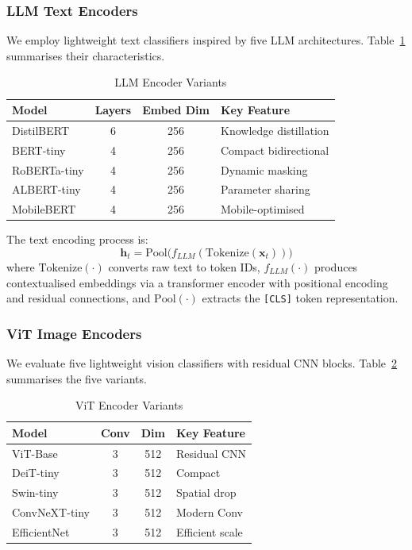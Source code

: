 \documentclass[conference]{IEEEtran}
\begin{document}
\subsubsection{LLM Text Encoders}

We employ lightweight text classifiers inspired by five LLM architectures.
Table~\ref{tab:llmenc} summarises their characteristics.

\begin{table}[t]
\caption{LLM Encoder Variants}
\label{tab:llmenc}
\centering\footnotesize
\begin{tabular}{lccl}
\toprule
\textbf{Model} & \textbf{Layers} & \textbf{Embed Dim} & \textbf{Key Feature}\\
\midrule
DistilBERT    & 6 & 256 & Knowledge distillation \\
BERT-tiny     & 4 & 256 & Compact bidirectional \\
RoBERTa-tiny  & 4 & 256 & Dynamic masking \\
ALBERT-tiny   & 4 & 256 & Parameter sharing \\
MobileBERT    & 4 & 256 & Mobile-optimised \\
\bottomrule
\end{tabular}
\end{table}

The text encoding process is:
\begin{equation}
  \mathbf{h}_t = \mathrm{Pool}\!\bigl(f_{LLM}(\mathrm{Tokenize}(\mathbf{x}_t))\bigr)
  \label{eq:textenc}
\end{equation}
where $\mathrm{Tokenize}(\cdot)$ converts raw text to token IDs, $f_{LLM}(\cdot)$
produces contextualised embeddings via a transformer encoder with positional encoding
and residual connections, and $\mathrm{Pool}(\cdot)$ extracts the \texttt{[CLS]} token
representation.

\subsubsection{ViT Image Encoders}

We evaluate five lightweight vision classifiers with residual CNN blocks.
Table~\ref{tab:vitenc} summarises the five variants.

\begin{table}[t]
\caption{ViT Encoder Variants}
\label{tab:vitenc}
\centering\footnotesize
\begin{tabular}{lccp{2.1cm}}
\toprule
\textbf{Model} & \textbf{Conv} & \textbf{Dim} & \textbf{Key Feature}\\
\midrule
ViT-Base      & 3 & 512 & Residual CNN \\
DeiT-tiny     & 3 & 512 & Compact \\
Swin-tiny     & 3 & 512 & Spatial drop \\
ConvNeXT-tiny & 3 & 512 & Modern Conv \\
EfficientNet  & 3 & 512 & Efficient scale \\
\bottomrule
\end{tabular}
\end{table}
\end{document}

